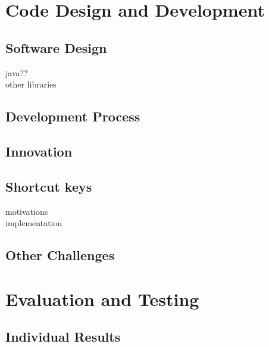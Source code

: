 \documentclass[conference]{IEEEtran}
\begin{document}
\section{Code Design and Development}
	\subsection{Software Design}
	java??\\other libraries\\
	\subsection{Development Process}
	\subsection{Innovation}
	\subsection{Shortcut keys}
	motivations\\implementation\\
	\subsection{Other Challenges}

\section{Evaluation and Testing}
	\subsection{Individual Results}
\end{document}
